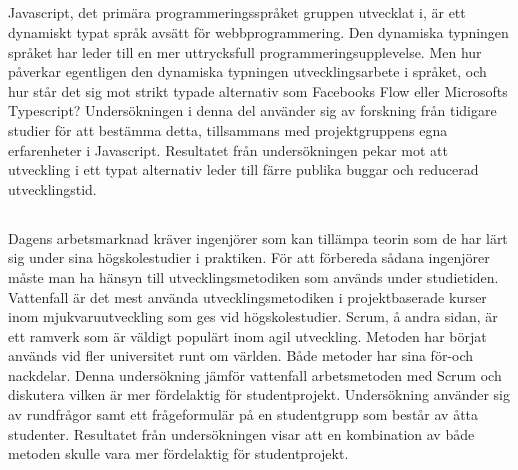 \subsection*{}
Javascript, det primära programmeringsspråket gruppen utvecklat i, är ett dynamiskt typat språk avsätt för webbprogrammering. Den dynamiska typningen språket har leder till en mer uttrycksfull programmeringsupplevelse. Men hur påverkar egentligen den dynamiska typningen utvecklingsarbete i språket, och hur står det sig mot strikt typade alternativ som Facebooks Flow eller Microsofts Typescript? Undersökningen i denna del använder sig av forskning från tidigare studier för att bestämma detta, tillsammans med projektgruppens egna erfarenheter i Javascript. Resultatet från undersökningen pekar mot att utveckling i ett typat alternativ leder till färre publika buggar och reducerad utvecklingstid.

\subsection*{}
Dagens arbetsmarknad kräver ingenjörer som kan tillämpa teorin som de har lärt sig under sina högskolestudier i praktiken. För att förbereda sådana ingenjörer måste man ha hänsyn till utvecklingsmetodiken som används under studietiden. Vattenfall är det mest använda utvecklingsmetodiken i projektbaserade kurser inom mjukvaruutveckling som ges vid högskolestudier. Scrum, å andra sidan, är ett ramverk som är väldigt populärt inom agil utveckling. Metoden har börjat används vid fler universitet runt om världen. Både metoder har sina för-och nackdelar. Denna undersökning jämför vattenfall arbetsmetoden med Scrum och diskutera vilken är mer fördelaktig för studentprojekt. Undersökning använder sig av rundfrågor samt ett frågeformulär på en studentgrupp som består av åtta studenter. Resultatet från undersökningen visar att en kombination av både metoden skulle vara mer fördelaktig för studentprojekt.
